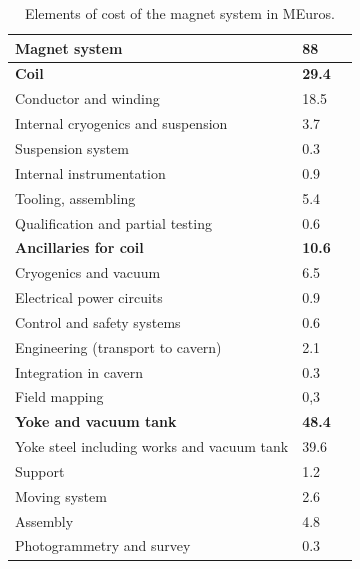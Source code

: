 
\begin{table}\hspace*{-0cm}\small 
\begin{tabular}[h!]{ l p{0.2\hsize}  p{0.1\hsize} }
\toprule
\textbf{Magnet system} & \textbf{88}\\
\midrule
\textbf{Coil} & \textbf{29.4}\\
\midrule
Conductor and winding & 18.5\\
Internal cryogenics and suspension &  3.7\\
Suspension system & 0.3 \\
Internal instrumentation & 0.9 \\
Tooling, assembling & 5.4 \\
Qualification and partial testing & 0.6\\
\midrule
\textbf{Ancillaries for coil} & \textbf{10.6}\\
\midrule
Cryogenics and vacuum & 6.5\\
Electrical power circuits & 0.9\\
Control and safety systems& 0.6 \\
Engineering (transport to cavern) & 2.1\\
Integration in cavern& 0.3 \\
Field mapping&0,3\\
\midrule
\textbf{Yoke and vacuum tank} & \textbf{48.4}\\
\midrule
Yoke steel including works and vacuum tank& 39.6\\
Support &1.2\\
Moving system& 2.6\\
Assembly& 4.8\\
Photogrammetry and survey& 0.3 \\
\bottomrule
\end{tabular}
\caption{\label{magnet_cost}Elements of cost of the magnet system in MEuros.}
\end{table}



